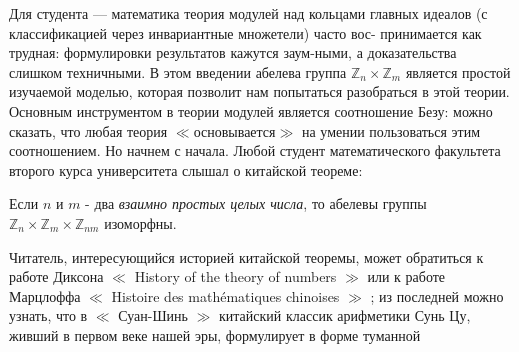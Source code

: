 Для студента --- математика теория модулей над кольцами главных \linebreak идеалов (с классификацией через инвариантные множетели) часто вос- \linebreak принимается как трудная: формулировки результатов кажутся заум-\linebreak ными, а доказательства слишком техничными. В этом введении абелева \linebreak группа $\mathbb{Z}_n \times \mathbb{Z}_m$ является простой изучаемой моделью, которая позволит \linebreak нам попытаться разобраться в этой теории. Основным инструментом в \linebreak теории модулей является соотношение Безу: можно сказать, что любая \linebreak теория $\ll$основывается$\gg$ на умении пользоваться этим соотношением. Но \linebreak начнем с начала. Любой студент математического факультета второго \linebreak курса университета слышал о китайской теореме: 
\begin{thm}

Если $n$ и $m$ - два \textit{ взаимно простых целых числа}, то абелевы группы \linebreak $\mathbb{Z}_n \times\mathbb{Z}_m\times\mathbb{Z}_{nm}$ изоморфны.
\end{thm}
  Читатель, интересующийся историей китайской теоремы, может \linebreak обратиться к работе Диксона $\ll$ History of the theory of numbers $\gg$ или к работе Марцлоффа $\ll$ Histoire des mathématiques chinoises $\gg$ ; из последней \linebreak можно узнать, что в $\ll$ Суан-Шинь $\gg$ китайский классик арифметики Сунь \linebreak Цу, живший в первом веке нашей эры, формулирует в форме туманной 
